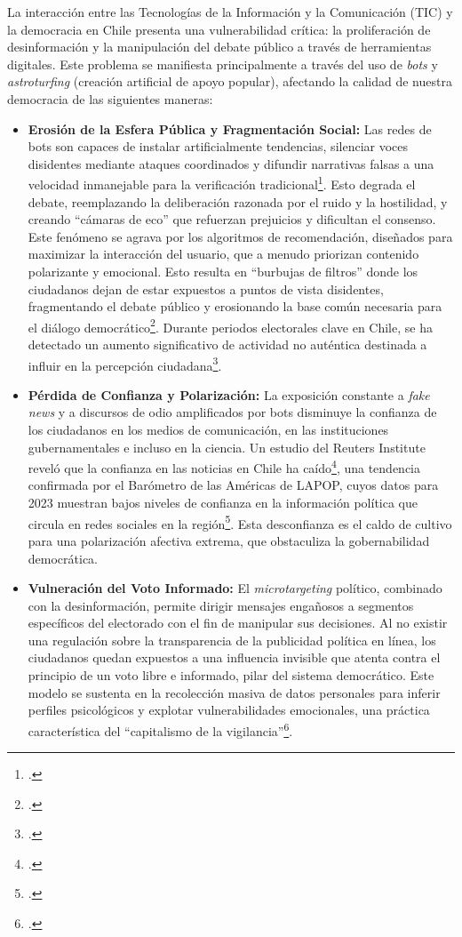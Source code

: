 \documentclass[12pt, letterpaper]{article}
\begin{document}
La interacción entre las Tecnologías de la Información y la Comunicación (TIC) y la democracia en Chile presenta una vulnerabilidad crítica: la proliferación de desinformación y la manipulación del debate público a través de herramientas digitales. Este problema se manifiesta principalmente a través del uso de \textit{bots} y \textit{astroturfing} (creación artificial de apoyo popular), afectando la calidad de nuestra democracia de las siguientes maneras:
\begin{itemize}[leftmargin=*, itemsep=0.5em]
	\item \textbf{Erosión de la Esfera Pública y Fragmentación Social:} Las redes de bots son capaces de instalar artificialmente tendencias, silenciar voces disidentes mediante ataques coordinados y difundir narrativas falsas a una velocidad inmanejable para la verificación tradicional\footcite{gurri_2018}. Esto degrada el debate, reemplazando la deliberación razonada por el ruido y la hostilidad, y creando ``cámaras de eco'' que refuerzan prejuicios y dificultan el consenso. Este fenómeno se agrava por los algoritmos de recomendación, diseñados para maximizar la interacción del usuario, que a menudo priorizan contenido polarizante y emocional. Esto resulta en ``burbujas de filtros'' donde los ciudadanos dejan de estar expuestos a puntos de vista disidentes, fragmentando el debate público y erosionando la base común necesaria para el diálogo democrático\footcite{pariser_2011}. Durante periodos electorales clave en Chile, se ha detectado un aumento significativo de actividad no auténtica destinada a influir en la percepción ciudadana\footcite{azerta_2021}.

	\item \textbf{Pérdida de Confianza y Polarización:} La exposición constante a \textit{fake news} y a discursos de odio amplificados por bots disminuye la confianza de los ciudadanos en los medios de comunicación, en las instituciones gubernamentales e incluso en la ciencia. Un estudio del Reuters Institute reveló que la confianza en las noticias en Chile ha caído\footcite{reuters_institute_2023}, una tendencia confirmada por el Barómetro de las Américas de LAPOP, cuyos datos para 2023 muestran bajos niveles de confianza en la información política que circula en redes sociales en la región\footcite{lapop_2023}. Esta desconfianza es el caldo de cultivo para una polarización afectiva extrema, que obstaculiza la gobernabilidad democrática.

	\item \textbf{Vulneración del Voto Informado:} El \textit{microtargeting} político, combinado con la desinformación, permite dirigir mensajes engañosos a segmentos específicos del electorado con el fin de manipular sus decisiones. Al no existir una regulación sobre la transparencia de la publicidad política en línea, los ciudadanos quedan expuestos a una influencia invisible que atenta contra el principio de un voto libre e informado, pilar del sistema democrático. Este modelo se sustenta en la recolección masiva de datos personales para inferir perfiles psicológicos y explotar vulnerabilidades emocionales, una práctica característica del ``capitalismo de la vigilancia''\footcite{zuboff_2019}.
\end{itemize}
\end{document}
